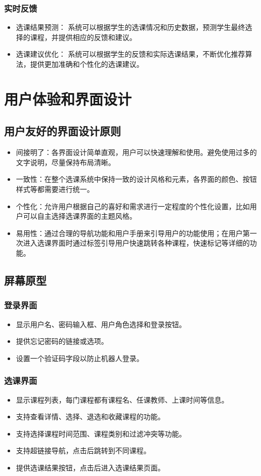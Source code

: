 \documentclass{article}
\begin{document}
\subsubsection{实时反馈}
\begin{itemize}
  \item 选课结果预测： 系统可以根据学生的选课情况和历史数据，预测学生最终选择的课程，并提供相应的反馈和建议。
  \item 选课建议优化： 系统可以根据学生的反馈和实际选课结果，不断优化推荐算法，提供更加准确和个性化的选课建议。
\end{itemize}


\section{用户体验和界面设计}
\subsection{用户友好的界面设计原则}
\begin{itemize}
	\item 间接明了：各界面设计简单直观，用户可以快速理解和使用。避免使用过多的文字说明，尽量保持布局清晰。
	\item 一致性：在整个选课系统中保持一致的设计风格和元素，各界面的颜色、按钮样式等都需要进行统一。
	\item 个性化：允许用户根据自己的喜好和需求进行一定程度的个性化设置，比如用户可以自主选择选课界面的主题风格。
	\item 易用性：通过合理的导航功能和用户手册来引导用户的功能使用；在用户第一次进入选课界面时通过标签引导用户快速跳转各种课程，快速标记等详细的功能。
\end{itemize}

\subsection{屏幕原型}
\subsubsection{登录界面}
\begin{itemize}
	\item 显示用户名、密码输入框、用户角色选择和登录按钮。
	\item 提供忘记密码的链接或选项。
	\item 设置一个验证码字段以防止机器人登录。
\end{itemize}

\subsubsection{选课界面}
\begin{itemize}
	\item 显示课程列表，每门课程都有课程名、任课教师、上课时间等信息。
	\item 支持查看详情、选择、退选和收藏课程的功能。
	\item 支持选择课程时间范围、课程类别和过滤冲突等功能。
	\item 支持超链接导航，点击后跳转到不同课程。
	\item 提供选课结果按钮，点击后进入选课结果页面。
\end{itemize}
\end{document}

